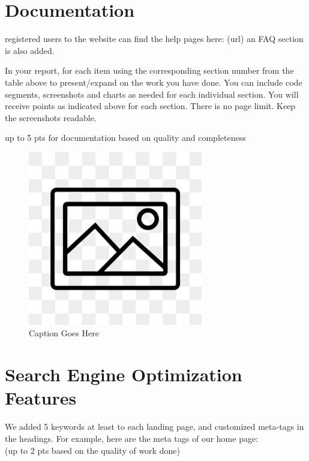 \documentclass[12pt, letterpaper]{article}
\begin{document}
 \newpage

\section{Documentation}
registered users to the website can find the help pages here: (url) an FAQ section is also added.

In your report, for each item using the corresponding section number from the table above to present/expand on the work you have done. You can include code segments, screenshots and charts as needed for each individual section. You will receive points as indicated above for each section. There is no page limit. Keep the screenshots readable.

up to 5 pts for documentation based on quality and completeness

\begin{figure}[htbp]
	\centering
	\includegraphics[width=3in]{images/placeholder.jpg}
	\caption{Caption Goes Here}
 \end{figure}

 \newpage

\section{Search Engine Optimization Features}
We added 5 keywords at least to each landing page, and customized meta-tags in the headings.
For example, here are the meta tags of our home page:
\\(up to 2 pts based on the quality of work done)
\end{document}
